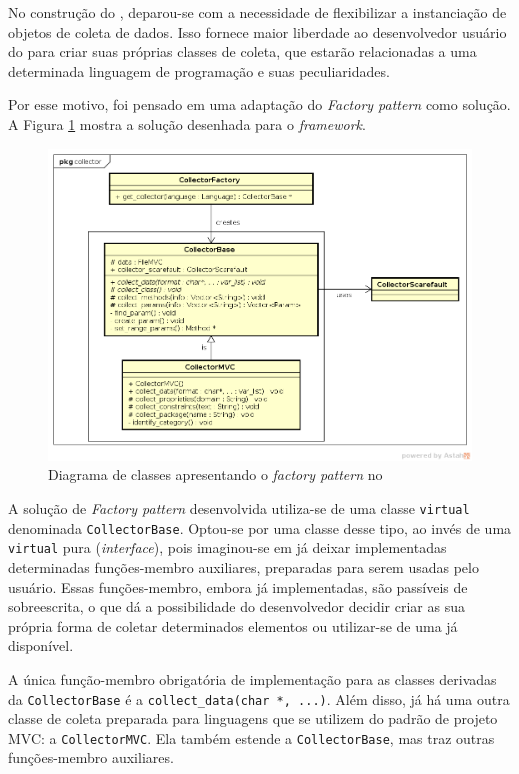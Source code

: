 No construção do \scarefault, deparou-se com a necessidade de flexibilizar
a instanciação de objetos de coleta de dados. Isso fornece maior liberdade
ao desenvolvedor usuário do \framework para criar suas próprias classes de
coleta, que estarão relacionadas a uma determinada linguagem de programação
e suas peculiaridades.

Por esse motivo, foi pensado em uma adaptação do \textit{Factory pattern} como 
solução. A Figura \ref{collector-diagram} mostra a solução desenhada para o 
\textit{framework}.


\begin{figure}[h]
  \centering
    \includegraphics[width=\textwidth]{figuras/collector-diagram.png}
    \caption{Diagrama de classes apresentando o \textit{factory pattern} no \framework}
    \label{collector-diagram}
\end{figure}
\FloatBarrier

A solução de \textit{Factory pattern} desenvolvida utiliza-se de uma classe
\lstinline|virtual| denominada \lstinline|CollectorBase|. Optou-se por uma classe
desse tipo, ao invés de uma \lstinline|virtual| pura (\textit{interface}), pois
imaginou-se em já deixar implementadas determinadas funções-membro auxiliares,
preparadas para serem usadas pelo usuário. Essas funções-membro, embora já implementadas,
são passíveis de sobreescrita, o que dá a possibilidade do desenvolvedor
decidir criar as sua própria forma de coletar determinados elementos ou utilizar-se
de uma já disponível.

A única função-membro obrigatória de implementação para as classes derivadas da
\lstinline|CollectorBase| é a \lstinline|collect_data(char *, ...)|. Além disso, já
há uma outra classe de coleta preparada para linguagens que se utilizem do padrão
de projeto MVC: a \lstinline|CollectorMVC|. Ela também estende a \lstinline|CollectorBase|,
mas traz outras funções-membro auxiliares.

